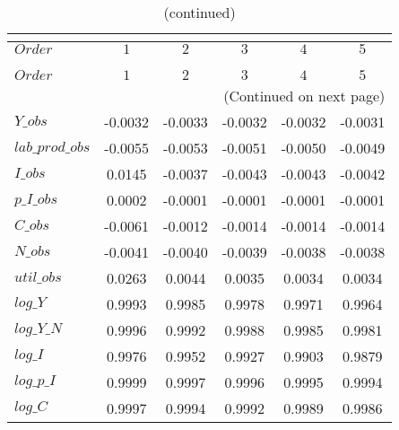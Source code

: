  
\begin{center}
\begin{longtable}{lccccc} 
\caption{COEFFICIENTS OF AUTOCORRELATION}\\
 \label{Table:th_autocorr_matrix}\\
\toprule 
$Order           $	 & 	 $          1$	 & 	 $          2$	 & 	 $          3$	 & 	 $          4$	 & 	 $          5$\\
\midrule \endfirsthead 
\caption{(continued)}\\
 \toprule \\ 
$Order           $	 & 	 $          1$	 & 	 $          2$	 & 	 $          3$	 & 	 $          4$	 & 	 $          5$\\
\midrule \endhead 
\midrule \multicolumn{6}{r}{(Continued on next page)} \\ \bottomrule \endfoot 
\bottomrule \endlastfoot 
$Y\_obs          $	 & 	    -0.0032	 & 	    -0.0033	 & 	    -0.0032	 & 	    -0.0032	 & 	    -0.0031 \\ 
$lab\_prod\_obs  $	 & 	    -0.0055	 & 	    -0.0053	 & 	    -0.0051	 & 	    -0.0050	 & 	    -0.0049 \\ 
$I\_obs          $	 & 	     0.0145	 & 	    -0.0037	 & 	    -0.0043	 & 	    -0.0043	 & 	    -0.0042 \\ 
$p\_I\_obs       $	 & 	     0.0002	 & 	    -0.0001	 & 	    -0.0001	 & 	    -0.0001	 & 	    -0.0001 \\ 
$C\_obs          $	 & 	    -0.0061	 & 	    -0.0012	 & 	    -0.0014	 & 	    -0.0014	 & 	    -0.0014 \\ 
$N\_obs          $	 & 	    -0.0041	 & 	    -0.0040	 & 	    -0.0039	 & 	    -0.0038	 & 	    -0.0038 \\ 
$util\_obs       $	 & 	     0.0263	 & 	     0.0044	 & 	     0.0035	 & 	     0.0034	 & 	     0.0034 \\ 
$log\_Y          $	 & 	     0.9993	 & 	     0.9985	 & 	     0.9978	 & 	     0.9971	 & 	     0.9964 \\ 
$log\_Y\_N       $	 & 	     0.9996	 & 	     0.9992	 & 	     0.9988	 & 	     0.9985	 & 	     0.9981 \\ 
$log\_I          $	 & 	     0.9976	 & 	     0.9952	 & 	     0.9927	 & 	     0.9903	 & 	     0.9879 \\ 
$log\_p\_I       $	 & 	     0.9999	 & 	     0.9997	 & 	     0.9996	 & 	     0.9995	 & 	     0.9994 \\ 
$log\_C          $	 & 	     0.9997	 & 	     0.9994	 & 	     0.9992	 & 	     0.9989	 & 	     0.9986 \\ 

\end{longtable}
\end{center}
